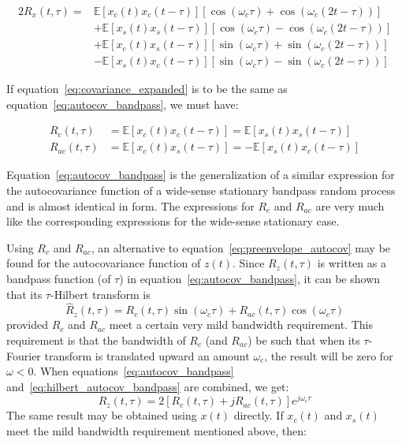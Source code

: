 \documentclass{article}
\begin{document}
\begin{align}
  2 R_x (t, \tau) = & \mathbb{E} [x_c (t) x_c (t - \tau)]  [\cos (\omega_c
  \tau) + \cos (\omega_c (2 t - \tau))] \\
  & +\mathbb{E} [x_s (t) x_s (t - \tau)]  [\cos (\omega_c \tau) - \cos
  (\omega_c (2 t - \tau))] \\
  & +\mathbb{E} [x_c (t) x_s (t - \tau)]  [\sin (\omega_c \tau) + \sin
  (\omega_c (2 t - \tau))] \\
  & -\mathbb{E} [x_s (t) x_c (t - \tau)]  [\sin (\omega_c \tau) - \sin
  (\omega_c (2 t - \tau))]  \label{eq:covariance_expanded}
\end{align}

If equation~\eqref{eq:covariance_expanded} is to be the same as
equation~\eqref{eq:autocov_bandpass}, we must have:

\begin{align}
  R_c (t, \tau) & =\mathbb{E} [x_c (t) x_c (t - \tau)] =\mathbb{E} [x_s (t)
  x_s (t - \tau)]  \label{eq:Rc_xc_xs}\\
  R_{ac} (t, \tau) & =\mathbb{E} [x_c (t) x_s (t - \tau)] = -\mathbb{E} [x_s
  (t) x_c (t - \tau)]  \label{eq:Rac_xc_xs}
\end{align}

Equation~\eqref{eq:autocov_bandpass} is the generalization of a similar
expression for the autocovariance function of a wide-sense stationary bandpass
random process and is almost identical in form. The expressions for $R_c$ and
$R_{ac}$ are very much like the corresponding expressions for the wide-sense
stationary case.

Using $R_c$ and $R_{ac}$, an alternative to
equation~\eqref{eq:preenvelope_autocov} may be found for the autocovariance
function of $z (t)$. Since $R_z (t, \tau)$ is written as a bandpass function
(of $\tau$) in equation~\eqref{eq:autocov_bandpass}, it can be
shown~{\cite{urkowitz1962}} that its $\tau$-Hilbert transform is
\begin{equation}
  \hat{R}_z (t, \tau) = R_c (t, \tau) \sin (\omega_c \tau) + R_{ac} (t, \tau)
  \cos (\omega_c \tau) \label{eq:hilbert_autocov_bandpass}
\end{equation}
provided $R_c$ and $R_{ac}$ meet a certain very mild bandwidth requirement.
This requirement is that the bandwidth of $R_c$ (and $R_{ac}$) be such that
when its $\tau$-Fourier transform is translated upward an amount $\omega_c$,
the result will be zero for $\omega < 0$. When
equations~\eqref{eq:autocov_bandpass} and~\eqref{eq:hilbert_autocov_bandpass}
are combined, we get:
\begin{equation}
  R_z (t, \tau) = 2 [R_c (t, \tau) + jR_{ac} (t, \tau)] e^{j \omega_c \tau}
  \label{eq:final_autocov}
\end{equation}
The same result may be obtained using $x (t)$ directly. If $x_c (t)$ and $x_s
(t)$ meet the mild bandwidth requirement mentioned above, then:
\end{document}
